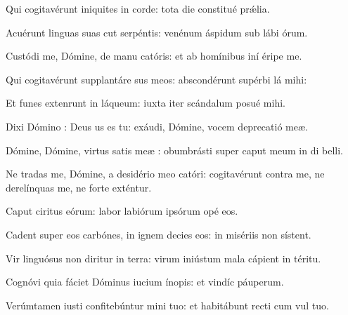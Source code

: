 \item {}

\item Qui cogitavérunt iniquites in corde:\psstar{} tota die constitué prǽlia.

\item Acuérunt linguas suas cut serpéntis:\psstar{} venénum áspidum sub lábi órum.

\item Custódi me, Dómine, de manu catóris:\psstar{} et ab homínibus iní éripe me.

\item Qui cogitavérunt supplantáre sus meos:\psstar{} abscondérunt supérbi lá mihi:

\item Et funes extenrunt in láqueum:\psstar{} iuxta iter scándalum posué mihi.

\item Dixi Dómino : Deus us es tu:\psstar{} exáudi, Dómine, vocem deprecatió meæ.

\item Dómine, Dómine, virtus satis meæ :\psstar{} obumbrásti super caput meum in di belli.

\item Ne tradas me, Dómine, a desidério meo catóri:\psstar{} cogitavérunt contra me, ne derelínquas me, ne forte exténtur.

\item Caput ciritus eórum:\psstar{} labor labiórum ipsórum opé eos.

\item Cadent super eos carbónes,\pscross{} in ignem decies eos:\psstar{} in misériis non sístent.

\item Vir linguósus non diritur in terra:\psstar{} virum iniústum mala cápient in téritu.

\item Cognóvi quia fáciet Dóminus iucium ínopis:\psstar{} et vindíc páuperum.

\item Verúmtamen iusti confitebúntur mini tuo:\psstar{} et habitábunt recti cum vul tuo.
